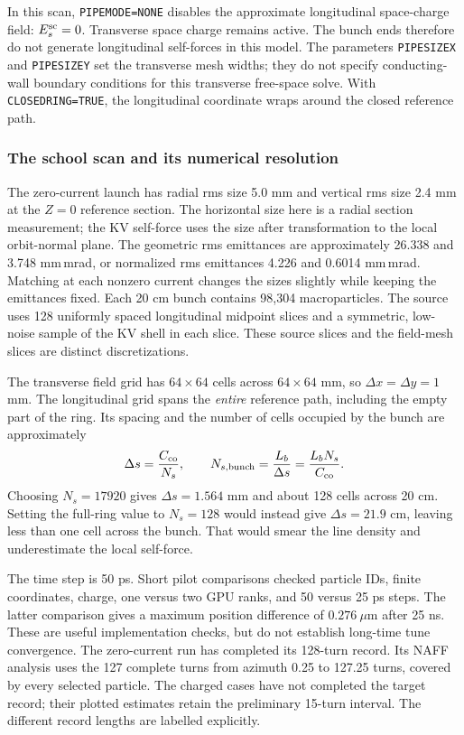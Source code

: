 In this scan, \texttt{PIPEMODE=NONE} disables the approximate longitudinal
space-charge field: $E_s^{\rm sc}=0$. Transverse space charge remains active.
The bunch ends therefore do not generate longitudinal self-forces in this
model. The parameters \texttt{PIPESIZEX} and \texttt{PIPESIZEY} set the transverse
mesh widths; they do not specify conducting-wall boundary conditions for this
transverse free-space solve. With \texttt{CLOSEDRING=TRUE}, the longitudinal
coordinate wraps around the closed reference path.

\subsubsection{The school scan and its numerical resolution}
The zero-current launch has radial rms size 5.0 mm and vertical rms size
2.4 mm at the $Z=0$ reference section. The horizontal size here is a radial
section measurement; the KV self-force uses the size after transformation to
the local orbit-normal plane. The geometric rms emittances are approximately
26.338 and 3.748 mm\,mrad, or normalized rms emittances 4.226 and
0.6014 mm\,mrad. Matching at each nonzero current changes the sizes slightly
while keeping the emittances fixed. Each 20 cm bunch contains 98,304
macroparticles. The source uses 128 uniformly spaced longitudinal midpoint
slices and a symmetric, low-noise sample of the KV shell in each slice.
These source slices and the field-mesh slices are distinct discretizations.

The transverse field grid has $64\times64$ cells across
$64\times64$ mm, so $\Delta x=\Delta y=1$ mm. The longitudinal grid spans the
\emph{entire} reference path, including the empty part of the ring. Its spacing
and the number of cells occupied by the bunch are approximately
\begin{equation}
 \Delta s=\frac{C_{\rm co}}{N_s},\qquad
 N_{s,\rm bunch}=\frac{L_b}{\Delta s}
      =\frac{L_bN_s}{C_{\rm co}}.
 \label{eq:sc-grid}
\end{equation}
Choosing $N_s=17920$ gives $\Delta s=1.564$ mm and about 128 cells across
20 cm. Setting the full-ring value to $N_s=128$ would instead give
$\Delta s=21.9$ cm, leaving less than one cell across the bunch. That would
smear the line density and underestimate the local self-force.

The time step is 50 ps. Short pilot comparisons checked particle IDs, finite
coordinates, charge, one versus two GPU ranks, and 50 versus 25 ps steps.
The latter comparison gives a maximum position difference of $0.276\ \mu$m
after 25 ns. These are useful implementation checks, but do not establish
long-time tune convergence. The zero-current run has completed its 128-turn
record. Its NAFF analysis uses the 127 complete turns from azimuth 0.25 to
127.25 turns, covered by every selected particle. The charged cases have not
completed the target record; their plotted estimates retain the preliminary
15-turn interval. The different record lengths are labelled explicitly.

